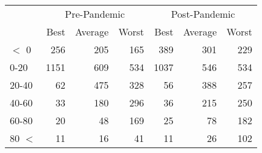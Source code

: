 
\begin{tabular}[t]{lrrrrrr}
\toprule
\multicolumn{1}{c}{ } & \multicolumn{3}{c}{Pre-Pandemic} & \multicolumn{3}{c}{Post-Pandemic} \\
\cmidrule(l{3pt}r{3pt}){2-4} \cmidrule(l{3pt}r{3pt}){5-7}
 & Best & Average & Worst & Best & Average & Worst\\
\midrule
$<$ 0 & 256 & 205 & 165 & 389 & 301 & 229\\
0-20 & 1151 & 609 & 534 & 1037 & 546 & 534\\
20-40 & 62 & 475 & 328 & 56 & 388 & 257\\
40-60 & 33 & 180 & 296 & 36 & 215 & 250\\
60-80 & 20 & 48 & 169 & 25 & 78 & 182\\
80 $<$ & 11 & 16 & 41 & 11 & 26 & 102\\
\bottomrule
\end{tabular}

